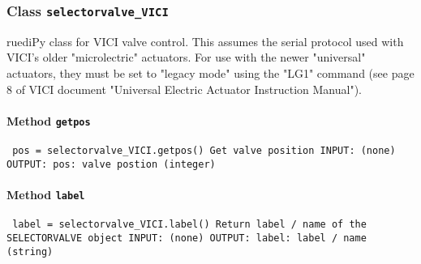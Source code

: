 \subsubsection{Class \texttt{selectorvalve_VICI}}
\par
ruediPy class for VICI valve control. This assumes the serial protocol used with VICI's older "microlectric" actuators. For use with the newer "universal" actuators, they must be set to "legacy mode" using the "LG1" command (see page 8 of VICI document "Universal Electric Actuator Instruction Manual").\par

\paragraph{Method \texttt{getpos}}
\vspace{1ex}
\texttt{\newline
pos = selectorvalve_VICI.getpos()\newline
\newline
Get valve position\newline
\newline
INPUT:\newline
(none)\newline
\newline
OUTPUT:\newline
pos: valve postion (integer)\newline
\newline
}

\paragraph{Method \texttt{label}}
\vspace{1ex}
\texttt{\newline
label = selectorvalve_VICI.label()\newline
\newline
Return label / name of the SELECTORVALVE object\newline
\newline
INPUT:\newline
(none)\newline
\newline
OUTPUT:\newline
label: label / name (string)\newline
\newline
}

